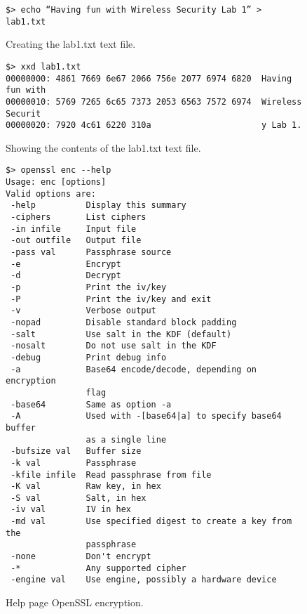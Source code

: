\documentclass{article}
\begin{document}
\begin{figure}
\begin{mdframed}
\begin{lstlisting}
$> echo “Having fun with Wireless Security Lab 1” > lab1.txt
\end{lstlisting}
\end{mdframed}
\caption{Creating the lab1.txt text file.}
\label{fig:step1a}
\end{figure}

\begin{figure}
\begin{mdframed}
\begin{lstlisting}
$> xxd lab1.txt
00000000: 4861 7669 6e67 2066 756e 2077 6974 6820  Having fun with 
00000010: 5769 7265 6c65 7373 2053 6563 7572 6974  Wireless Securit
00000020: 7920 4c61 6220 310a                      y Lab 1.
\end{lstlisting}
\end{mdframed}
\caption{Showing the contents of the lab1.txt text file.}
\label{fig:step1b}
\end{figure}

\begin{figure}
\begin{mdframed}
\begin{lstlisting}
$> openssl enc --help
Usage: enc [options]
Valid options are:
 -help          Display this summary
 -ciphers       List ciphers
 -in infile     Input file
 -out outfile   Output file
 -pass val      Passphrase source
 -e             Encrypt
 -d             Decrypt
 -p             Print the iv/key
 -P             Print the iv/key and exit
 -v             Verbose output
 -nopad         Disable standard block padding
 -salt          Use salt in the KDF (default)
 -nosalt        Do not use salt in the KDF
 -debug         Print debug info
 -a             Base64 encode/decode, depending on encryption
                flag
 -base64        Same as option -a
 -A             Used with -[base64|a] to specify base64 buffer
                as a single line
 -bufsize val   Buffer size
 -k val         Passphrase
 -kfile infile  Read passphrase from file
 -K val         Raw key, in hex
 -S val         Salt, in hex
 -iv val        IV in hex
 -md val        Use specified digest to create a key from the
                passphrase
 -none          Don't encrypt
 -*             Any supported cipher
 -engine val    Use engine, possibly a hardware device
\end{lstlisting}
\end{mdframed}
\caption{Help page OpenSSL encryption.}
\label{fig:step1c}
\end{figure}
\end{document}

